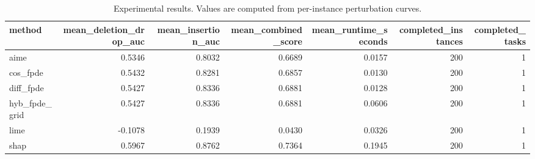 \begin{table}[t]
\caption{Experimental results. Values are computed from per-instance perturbation curves.}
\label{tab:main_results_computed}
\centering
\begin{tabular}{lrrrrrr}
\toprule
method & mean\_deletion\_drop\_auc & mean\_insertion\_auc & mean\_combined\_score & mean\_runtime\_seconds & completed\_instances & completed\_tasks \\
\midrule
aime & 0.5346 & 0.8032 & 0.6689 & 0.0157 & 200 & 1 \\
cos\_fpde & 0.5432 & 0.8281 & 0.6857 & 0.0130 & 200 & 1 \\
diff\_fpde & 0.5427 & 0.8336 & 0.6881 & 0.0128 & 200 & 1 \\
hyb\_fpde\_grid & 0.5427 & 0.8336 & 0.6881 & 0.0606 & 200 & 1 \\
lime & -0.1078 & 0.1939 & 0.0430 & 0.0326 & 200 & 1 \\
shap & 0.5967 & 0.8762 & 0.7364 & 0.1945 & 200 & 1 \\
\bottomrule
\end{tabular}

\end{table}
